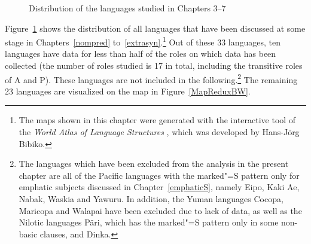 \begin{figure}[h,t,b] \centering {}%
\caption{Distribution of the languages studied in Chapters 3--7}\label{MapFullBW}
\end{figure}

Figure~\ref{MapFullBW} shows the distribution of all languages that have been discussed at some stage in Chapters~\ref{nompred} to~\ref{extrasyn}.\footnote{The maps shown in this chapter were generated with the interactive tool of the \textit{World Atlas of Language Structures} \citep{WALS}, which was developed by Hans-J\"org Bibiko.} 
Out of these 33 languages, ten languages have data for less than half of the  roles on which data has been collected (the number of roles studied is 17 in total, including the transitive roles of A and P). 
These languages are not included in the following.\footnote{The languages which have been excluded from the analysis in the present chapter are all of the Pacific languages with the marked"=S pattern only for emphatic subjects discussed in Chapter~\ref{emphaticS}, namely Eipo, Kaki Ae, Nabak, Waskia and Yawuru. In addition, the Yuman languages Cocopa, Maricopa and Walapai have been excluded due to lack of data, as well as the Nilotic languages P\"ari, which has the marked"=S pattern only in some non-basic clauses, and Dinka.} 
The remaining 23 languages are visualized on the map in Figure~\ref{MapReduxBW}.

